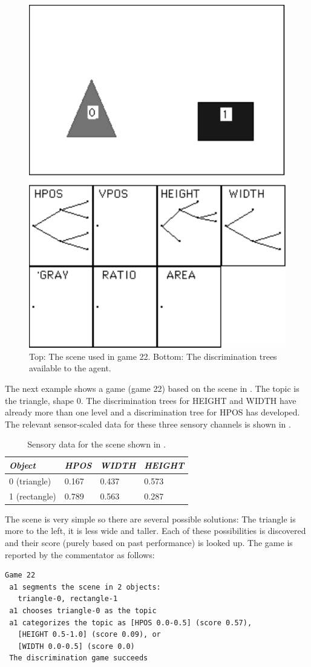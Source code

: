 \begin{figure}[htbp]
  \centerline{\includegraphics[width=.40\textwidth]{chap4/figs/scene22}}
\caption{\label{scene3} Top: The scene used in game 22. 
Bottom: The discrimination trees available to the
agent.}
\end{figure}
The next example shows a game (game 22) based on the scene 
in . The topic is the triangle, shape 0. 
The discrimination trees for 
HEIGHT and WIDTH have already more than one level and 
a discrimination tree for HPOS has developed.
The relevant sensor-scaled data for these three sensory
channels is shown in . 
\begin{table}
\begin{center}
\begin{tabular}{| l | l | l | l |} \hline
{\it Object} & {\it HPOS} & {\it WIDTH} & {\it HEIGHT} \\ \hline
0 (triangle) & 0.167 & 0.437 & 0.573  \\ \hline
1 (rectangle) & 0.789 & 0.563 & 0.287 \\ \hline 
\end{tabular}
\caption{\label{tab:t-game22} Sensory data for the scene shown in .}
\end{center}
\end{table}

The scene is very simple so there are several possible
solutions: The triangle is more to the left, it is less wide 
and taller. Each of these possibilities is discovered
and their score (purely based on past performance) is 
looked up. The game is reported by the commentator
as follows: 
\begin{verbatim}
Game 22
 a1 segments the scene in 2 objects:  
   triangle-0, rectangle-1
 a1 chooses triangle-0 as the topic 
 a1 categorizes the topic as [HPOS 0.0-0.5] (score 0.57), 
   [HEIGHT 0.5-1.0] (score 0.09), or 
   [WIDTH 0.0-0.5] (score 0.0) 
 The discrimination game succeeds
\end{verbatim}

